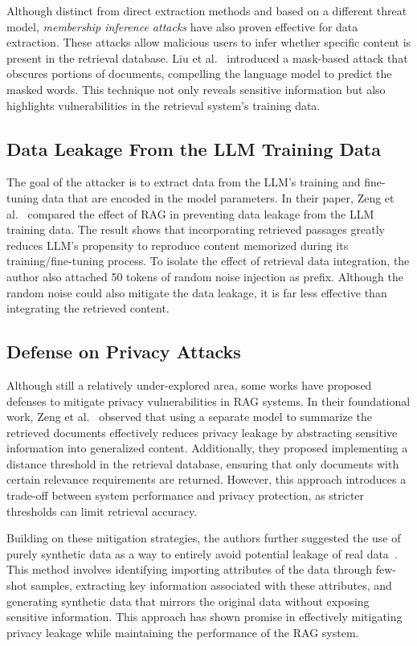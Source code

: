 Although distinct from direct extraction methods and based on a different threat model, \textit{membership inference attacks} have also proven effective for data extraction. These attacks allow malicious users to infer whether specific content is present in the retrieval database. Liu et al.~\cite{liu2024mask} introduced a mask-based attack that obscures portions of documents, compelling the language model to predict the masked words. This technique not only reveals sensitive information but also highlights vulnerabilities in the retrieval system's training data.
 

\subsection{Data Leakage From the LLM Training Data}
The goal of the attacker is to extract data from the LLM's training and fine-tuning data that are encoded in the model parameters. In their paper, Zeng et al.~\cite{privacy_rag_2024} compared the effect of RAG in preventing data leakage from the LLM training data. The result shows that incorporating retrieved passages greatly reduces LLM's propensity to reproduce content memorized during its training/fine-tuning process. To isolate the effect of retrieval data integration, the author also attached 50 tokens of random noise injection as prefix. Although the random noise could also mitigate the data leakage, it is far less effective than integrating the retrieved content. 

\subsection{Defense on Privacy Attacks}
Although still a relatively under-explored area, some works have proposed defenses to mitigate privacy vulnerabilities in RAG systems. In their foundational work, Zeng et al.~\cite{privacy_rag_2024} observed that using a separate model to summarize the retrieved documents effectively reduces privacy leakage by abstracting sensitive information into generalized content. Additionally, they proposed implementing a distance threshold in the retrieval database, ensuring that only documents with certain relevance requirements are returned. However, this approach introduces a trade-off between system performance and privacy protection, as stricter thresholds can limit retrieval accuracy.

Building on these mitigation strategies, the authors further suggested the use of purely synthetic data as a way to entirely avoid potential leakage of real data~\cite{zeng2024mitigating}. This method involves identifying importing attributes of the data through few-shot samples, extracting key information associated with these attributes, and generating synthetic data that mirrors the original data without exposing sensitive information. This approach has shown promise in effectively mitigating privacy leakage while maintaining the performance of the RAG system.

